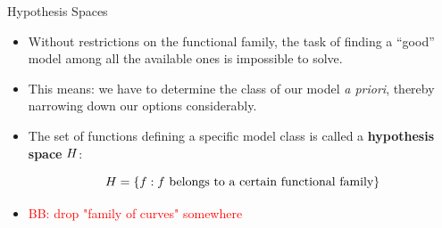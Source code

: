 \documentclass[11pt,compress,t,notes=noshow, xcolor=table]{beamer}
\begin{document}

\begin{vbframe}{Hypothesis Spaces}

\begin{itemize}

  \item Without restrictions on the functional family, the task of finding a 
  \enquote{good} model among all the available ones is impossible to solve.
  
  \item This means: we have to determine the class of our model \emph{a priori}, 
  thereby narrowing down our options considerably.
  
  \item The set of functions defining a specific model class is called a 
  \textbf{hypothesis space} $H$:
  
  $$H = \{f: f \text{ belongs to a certain functional family}\}$$
  
  \item \textcolor{red}{BB: drop "family of curves" somewhere}

\end{itemize}  

\end{vbframe}

\end{document}
